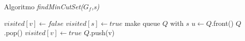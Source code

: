         \begin{algorithm}
            \caption{Algoritmo \textit{findMinCutSet($G_f$,s)}}
            \begin{algorithmic}
                    \State $visited[v] \gets false$
                \EndFor
                \State $visited[s] \gets true$
                \State make queue $Q$ with $s$
                    \State $u \gets Q$.front()
                    \State $Q$.pop()
                     \qquad {}
                            \State $visited[v] \gets true$
                            \State $Q$.push(v)
                        \EndIf
                    \EndFor
                \EndWhile
            \end{algorithmic}
        \end{algorithm}

